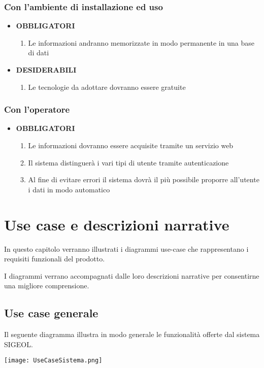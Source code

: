 \documentclass[11pt,a4paper]{article}
\begin{document}
\subsubsection{Con l’ambiente di installazione ed uso}
\begin{itemize}
\item \textbf{OBBLIGATORI}
\begin{enumerate}
\item Le informazioni andranno memorizzate in modo permanente in una base di dati
\end{enumerate}
\item \textbf{DESIDERABILI}
\begin{enumerate}
\item Le tecnologie da adottare dovranno essere gratuite
\end{enumerate}
\end{itemize}
\subsubsection{Con l’operatore}
\begin{itemize}
\item \textbf{OBBLIGATORI}
\begin{enumerate}
\item Le informazioni dovranno essere acquisite tramite un servizio web
\item Il sistema distinguerà i vari tipi di utente tramite autenticazione
\item Al fine di evitare errori il sistema dovrà il più possibile proporre all'utente i dati in modo automatico
\end{enumerate}
\end{itemize}
\section{Use case e descrizioni narrative}
In questo capitolo verranno illustrati i diagrammi use-case che rappresentano
i requisiti funzionali del prodotto. 

I diagrammi verrano accompagnati dalle loro descrizioni narrative per consentirne
una migliore comprensione.
\subsection{Use case generale}
Il seguente diagramma illustra in modo generale le funzionalità offerte dal sistema SIGEOL.
\begin{center}
 \texttt{[image: UseCaseSistema.png]}
\end{center}
\end{document}
